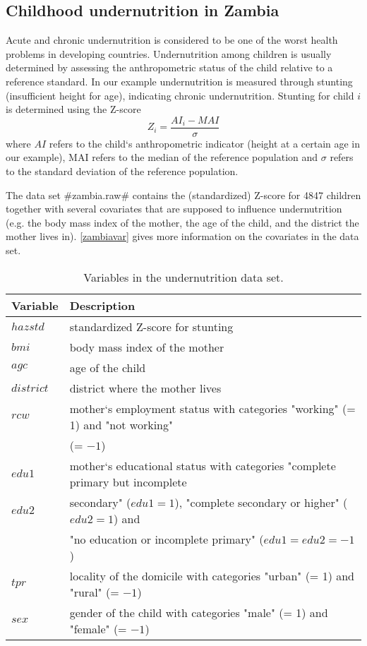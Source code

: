 \subsection{Childhood undernutrition in Zambia}
 \label{zambia} 

Acute and chronic undernutrition is considered to be one of the worst health problems in developing countries. Undernutrition among children is usually determined by assessing the
anthropometric status of the child relative to a reference standard. In our example undernutrition is measured through stunting (insufficient height for age), indicating chronic
undernutrition. Stunting for child $i$ is determined using the Z-score
\[
 Z_i = \frac{AI_i-MAI}{\sigma}
\]
where $AI$ refers to the child`s anthropometric indicator (height at a certain age in our example), MAI refers to the median of the reference population and $\sigma$ refers to the standard deviation
of the reference population. 

The data set #zambia.raw# contains the (standardized) Z-score for 4847 children together with several covariates that are supposed to influence undernutrition (e.g. the body mass index of the
mother, the age of the child, and the district the mother lives in). \autoref{zambiavar} gives more information on the covariates in the data set.

\begin{table}
\begin{center}
\begin{tabular}{|l|l|}
 \hline
 {\bf Variable} & {\bf Description}\\
 \hline
 $hazstd$ & standardized Z-score for stunting\\
 $bmi$ & body mass index of the mother\\
 $agc$ & age of the child\\
 $district$ & district where the mother lives\\
 $rcw$ & mother`s employment status with categories "working" (= 1) and "not working" \\
 & (= $-1$)\\
 $edu1$ & mother`s educational status with categories "complete primary but incomplete\\
 $edu2$ & secondary" ($edu1=1$), "complete secondary or higher" ($edu2=1$) and\\
 & "no education or incomplete primary" ($edu1=edu2=-1$)\\
 $tpr$ & locality of the domicile with categories "urban" (= 1) and "rural" (= $-1$)\\
 $sex$ & gender of the child with categories "male" (= 1) and
 "female" (= $-1$)\\
 \hline
\end{tabular}
{\em\caption{Variables in the undernutrition data set.
\label{zambiavar}}}
\end{center}
\end{table}
